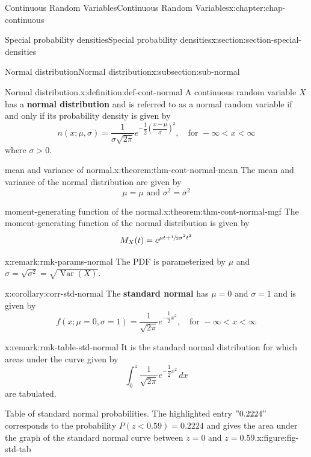\documentclass[oneside,10pt,]{book}
\newcommand{\terminology}[1]{\textbf{#1}}
\newcommand{\lt}{<}
\newcommand{\gt}{>}
\begin{document}
\begin{chapterptx}{Continuous Random Variables}{}{Continuous Random Variables}{}{}{x:chapter:chap-continuous}
\begin{sectionptx}{Special probability densities}{}{Special probability densities}{}{}{x:section:section-special-densities}
\begin{subsectionptx}{Normal distribution}{}{Normal distribution}{}{}{x:subsection:sub-normal}
\begin{definition}{Normal distribution.}{x:definition:def-cont-normal}
A continuous random variable \(\displaystyle X\) has a \terminology{normal distribution} and is referred to as a normal random variable if and only if its probability density is given by%
\begin{equation*}
n(x; \mu, \sigma) = \dfrac{1}{\sigma\sqrt{2\pi}}
e^{-\dfrac{1}{2}\left(\dfrac{x-\mu}{\sigma}\right)^2}, \quad \text{
for }-\infty \lt x \lt \infty
\end{equation*}
where \(\sigma \gt 0\).%
\end{definition}
\begin{theorem}{mean and variance of normal.}{}{x:theorem:thm-cont-normal-mean}%
The mean and variance of the normal distribution are given by%
\begin{equation*}
\mu = \mu\text{ and }\sigma^2 = \sigma^2
\end{equation*}
%
\end{theorem}
\begin{theorem}{moment-generating function of the normal.}{}{x:theorem:thm-cont-normal-mgf}%
The moment-generating function of the normal distribution is given by%
\begin{equation*}
M_X(t) = e^{\mu t + \sfrac{1}{2}\sigma^2t^2}
\end{equation*}
%
\end{theorem}
\begin{remark}{}{x:remark:rmk-params-normal}%
The PDF is parameterized by \(\mu\) and \(\sigma = \sqrt{\sigma^2} =
\sqrt{\operatorname{Var}(X)}\).%
\end{remark}
\begin{corollary}{}{}{x:corollary:corr-std-normal}%
The \terminology{standard normal} has \(\mu = 0\) and \(\sigma =
1\) and is given by%
\begin{equation*}
f(x; \mu = 0, \sigma = 1) =
\dfrac{1}{\sqrt{2\pi}}
e^{-\dfrac{1}{2}x^2}, \quad \text{
for }-\infty \lt x \lt \infty
\end{equation*}
%
\end{corollary}
\begin{remark}{}{x:remark:rmk-table-std-normal}%
It is the standard normal distribution for which areas under the curve given by%
\begin{equation*}
\int_0^z \dfrac{1}{\sqrt{2\pi}}
e^{-\dfrac{1}{2}x^2}\,dx
\end{equation*}
are tabulated.%
\begin{figureptx}{Table of standard normal probabilities. The highlighted entry \("0.2224"\) corresponds to the probability \(P(z \lt 0.59) =
0.2224\) and gives the area under the graph of the standard normal curve between \(z=0\) and \(z =0.59\).}{x:figure:fig-std-tab}{}%

\end{figureptx}
\end{remark}
\end{subsectionptx}
\end{sectionptx}
\end{chapterptx}
\end{document}
